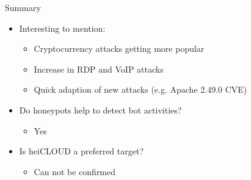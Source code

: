 \begin{frame}{Summary}
    \begin{itemize}
        \item Interesting to mention:
        \begin{itemize}
            \item Cryptocurrency attacks getting more popular
            \item Increase in RDP and VoIP attacks
            \item Quick adaption of new attacks (e.g. Apache 2.49.0 CVE)
        \end{itemize}
        \item Do honeypots help to detect bot activities?
        \begin{itemize}
            \item Yes
        \end{itemize}
        \item Is heiCLOUD a preferred target?
        \begin{itemize}
            \item Can not be confirmed
        \end{itemize}
    \end{itemize}
\end{frame}
